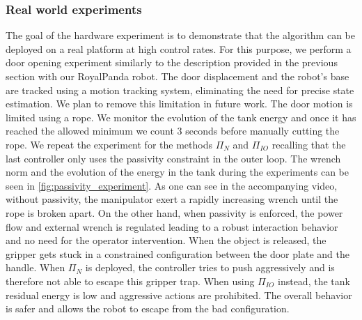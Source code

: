 \vspace{0.3cm}
\subsubsection{Real world experiments}
The goal of the hardware experiment is to demonstrate that the algorithm can be deployed on a real platform at high control rates. For this purpose, we perform a door opening experiment similarly to the description provided in the previous section with our RoyalPanda robot. The door displacement and the robot's base are tracked using a motion tracking system, eliminating the need for precise state estimation. We plan to remove this limitation in future work. The door motion is limited using a rope. We monitor the evolution of the tank energy and once it has reached the allowed minimum we count 3 seconds before manually cutting the rope. We repeat the experiment for the methods $\Pi_{N}$ and $\Pi_{IO}$ recalling that the last controller only uses the passivity constraint in the outer loop. The wrench norm and the evolution of the energy in the tank during the experiments can be seen in \fig \ref{fig:passivity_experiment}. As one can see in the accompanying video, without passivity, the manipulator exert a rapidly increasing wrench until the rope is broken apart. On the other hand, when passivity is enforced, the power flow and external wrench is regulated leading to a robust interaction behavior and no need for the operator intervention. When the object is released, the gripper gets stuck in a constrained configuration between the door plate and the handle. When $\Pi_{N}$ is deployed, the controller tries to push aggressively and is therefore not able to escape this gripper trap. When using $\Pi_{IO}$ instead, the tank residual energy is low and aggressive actions are prohibited. The overall behavior is safer and allows the robot to escape from the bad configuration.  

